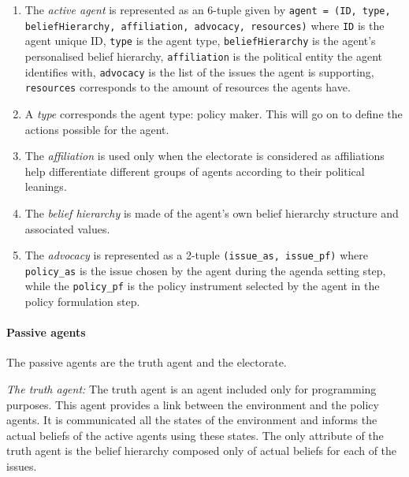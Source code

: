 \documentclass[11pt]{article}
\begin{document}
\begin{enumerate}

\item The \emph{active agent} is represented as an 6-tuple given by \texttt{agent = (ID, type, beliefHierarchy, affiliation, advocacy, resources)} where
\texttt{ID} is the agent unique ID,
\texttt{type} is the agent type, 
\texttt{beliefHierarchy} is the agent's personalised belief hierarchy, 
\texttt{affiliation} is the political entity the agent identifies with,  
\texttt{advocacy} is the list of the issues the agent is supporting,
\texttt{resources} corresponds to the amount of resources the agents have.

\item A \emph{type} corresponds the agent type: policy maker. This will go on to define the actions possible for the agent.

\item The \emph{affiliation} is used only when the electorate is considered as affiliations help differentiate different groups of agents according to their political leanings.

\item The \emph{belief hierarchy} is made of the agent's own belief hierarchy structure and associated values.

\item The \emph{advocacy} is represented as a 2-tuple \texttt{(issue\_as, issue\_pf)} where \texttt{policy\_as} is the issue chosen by the agent during the agenda setting step, while the \texttt{policy\_pf} is the policy instrument selected by the agent in the policy formulation step.

\end{enumerate}



\paragraph{Passive agents}

The passive agents are the truth agent and the electorate.

\emph{The truth agent:} The truth agent is an agent included only for programming purposes. This agent provides a link between the environment and the policy agents. It is communicated all the states of the environment and informs the actual beliefs of the active agents using these states. The only attribute of the truth agent is the belief hierarchy composed only of actual beliefs for each of the issues.
\end{document}
